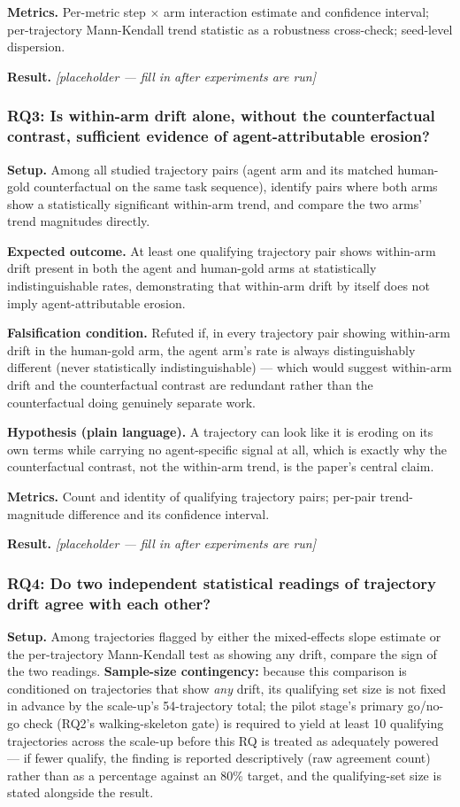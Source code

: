\documentclass[11pt]{article}
\newcommand{\ph}{\textit{[placeholder --- fill in after experiments are run]}}
\begin{document}
\textbf{Metrics.} Per-metric step $\times$ arm interaction estimate and confidence interval; per-trajectory Mann-Kendall trend statistic as a robustness cross-check; seed-level dispersion.

\textbf{Result.} \ph

\subsubsection{RQ3: Is within-arm drift alone, without the counterfactual contrast, sufficient evidence of agent-attributable erosion?}
\textbf{Setup.} Among all studied trajectory pairs (agent arm and its matched human-gold counterfactual on the same task sequence), identify pairs where both arms show a statistically significant within-arm trend, and compare the two arms' trend magnitudes directly.

\textbf{Expected outcome.} At least one qualifying trajectory pair shows within-arm drift present in both the agent and human-gold arms at statistically indistinguishable rates, demonstrating that within-arm drift by itself does not imply agent-attributable erosion.

\textbf{Falsification condition.} Refuted if, in every trajectory pair showing within-arm drift in the human-gold arm, the agent arm's rate is always distinguishably different (never statistically indistinguishable) --- which would suggest within-arm drift and the counterfactual contrast are redundant rather than the counterfactual doing genuinely separate work.

\textbf{Hypothesis (plain language).} A trajectory can look like it is eroding on its own terms while carrying no agent-specific signal at all, which is exactly why the counterfactual contrast, not the within-arm trend, is the paper's central claim.

\textbf{Metrics.} Count and identity of qualifying trajectory pairs; per-pair trend-magnitude difference and its confidence interval.

\textbf{Result.} \ph

\subsubsection{RQ4: Do two independent statistical readings of trajectory drift agree with each other?}
\textbf{Setup.} Among trajectories flagged by either the mixed-effects slope estimate or the per-trajectory Mann-Kendall test as showing any drift, compare the sign of the two readings. \textbf{Sample-size contingency:} because this comparison is conditioned on trajectories that show \emph{any} drift, its qualifying set size is not fixed in advance by the scale-up's 54-trajectory total; the pilot stage's primary go/no-go check (RQ2's walking-skeleton gate) is required to yield at least 10 qualifying trajectories across the scale-up before this RQ is treated as adequately powered --- if fewer qualify, the finding is reported descriptively (raw agreement count) rather than as a percentage against an 80\% target, and the qualifying-set size is stated alongside the result.
\end{document}
